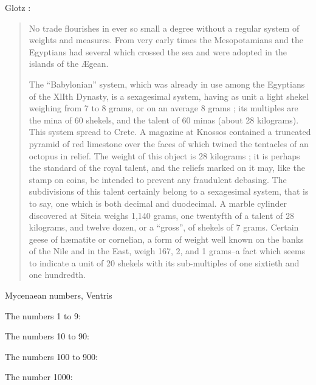 \documentclass{article}
\begin{document}
Glotz \cite[pp.~191--192]{glotz}:

\begin{quote}
No trade  flourishes in ever so small a degree without a regular system of weights and measures. From very early times the  Mesopotamians and the Egyptians had several which crossed the sea and were adopted in the islands of the  \AE{}gean.

The ``Babylonian'' system, which was already in use among the Egyptians of the XlIth Dynasty, is a sexagesimal system, having as unit a light shekel weighing from 7 to 8 grams, or on an average 8 grams ; its multiples are the mina of 60 shekels, and the talent of 60 minas (about 28 kilograms). This
system spread to Crete. A magazine at Knossos contained a truncated pyramid of red limestone over the faces of which twined the tentacles of an octopus in relief. 
The weight of this object is 28 kilograms ; it is
perhaps the standard of the royal talent, and the reliefs marked on it may, like the stamp on coins, be intended to prevent any fraudulent debasing. The subdivisions of this talent certainly belong to a sexagesimal system, that is to say, one which is both decimal and duodecimal. A marble cylinder discovered at Siteia weighs 1,140 grams, one twentyfth of a talent of 28
kilograms, and twelve dozen, or a ``gross'', of shekels of 7 grams. Certain geese of h\ae{}matite or cornelian,
a form of weight well known on the banks of the Nile and in the East, weigh 167, 2, and 1 grams--a fact which seems to indicate a unit of 20 shekels with its sub-multiples of one sixtieth and one hundredth.
\end{quote}







Mycenaean numbers, Ventris \cite[p.~57]{ventris}

    The numbers 1 to 9: \textlinb{\BNi{} \BNii{} \BNiii{} \BNiv{} \BNv{} \BNvi{} \BNvii{} \BNviii{} \BNix}

    The numbers 10 to 90: \textlinb{\BNx{} \BNxx{} \BNxxx{} \BNxl{} \BNl{} \BNlx{} \BNlxx{} \BNlxxx{} \BNxc}

    The numbers 100 to 900: \textlinb{\BNc{} \BNcc{} \BNccc{} \BNcd{} \BNd{} \BNdc{} \BNdcc{} \BNdccc{} \BNcm}

    The number 1000: \textlinb{\BNm}
    
\end{document}
